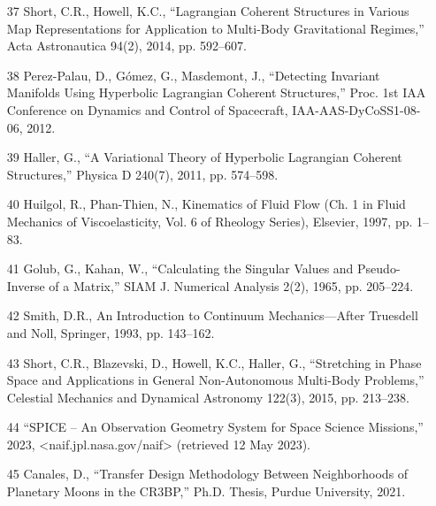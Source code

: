 \documentclass[12pt]{article}
\begin{document}
\begin{enumerate}
\item [37] Short, C.R., Howell, K.C., ``Lagrangian Coherent Structures in Various Map Representations for Application to Multi-Body Gravitational Regimes,'' Acta Astronautica 94(2), 2014, pp. 592--607.
\item [38] Perez-Palau, D., Gómez, G., Masdemont, J., ``Detecting Invariant Manifolds Using Hyperbolic Lagrangian Coherent Structures,'' Proc. 1st IAA Conference on Dynamics and Control of Spacecraft, IAA-AAS-DyCoSS1-08-06, 2012.
\item [39] Haller, G., ``A Variational Theory of Hyperbolic Lagrangian Coherent Structures,'' Physica D 240(7), 2011, pp. 574--598.
\item [40] Huilgol, R., Phan-Thien, N., Kinematics of Fluid Flow (Ch. 1 in Fluid Mechanics of Viscoelasticity, Vol. 6 of Rheology Series), Elsevier, 1997, pp. 1--83.
\item [41] Golub, G., Kahan, W., ``Calculating the Singular Values and Pseudo-Inverse of a Matrix,'' SIAM J. Numerical Analysis 2(2), 1965, pp. 205--224.
\item [42] Smith, D.R., An Introduction to Continuum Mechanics—After Truesdell and Noll, Springer, 1993, pp. 143--162.
\item [43] Short, C.R., Blazevski, D., Howell, K.C., Haller, G., ``Stretching in Phase Space and Applications in General Non-Autonomous Multi-Body Problems,'' Celestial Mechanics and Dynamical Astronomy 122(3), 2015, pp. 213--238.
\item [44] ``SPICE – An Observation Geometry System for Space Science Missions,'' 2023, <naif.jpl.nasa.gov/naif> (retrieved 12 May 2023).
\item [45] Canales, D., ``Transfer Design Methodology Between Neighborhoods of Planetary Moons in the CR3BP,'' Ph.D. Thesis, Purdue University, 2021.
\end{enumerate}
\end{document}
